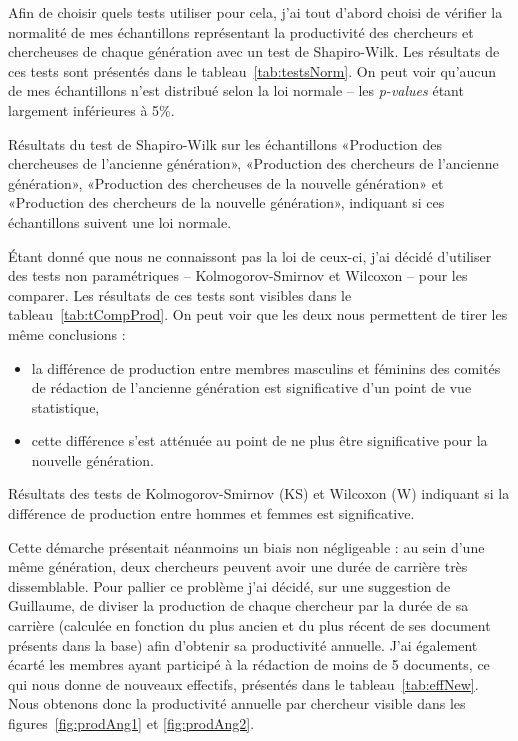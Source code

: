 			Afin de choisir quels tests utiliser pour cela, j'ai tout d'abord choisi de vérifier la normalité de mes échantillons représentant la productivité des chercheurs et chercheuses de chaque génération avec un test de Shapiro-Wilk. Les résultats de ces tests sont présentés dans le tableau~\ref{tab:testsNorm}. On peut voir qu'aucun de mes échantillons n'est distribué selon la loi normale -- les \textit{p-values} étant largement inférieures à 5\%.
			
			\begin{table}[ht]
				\centering
				\caption{Résultats du test de Shapiro-Wilk sur les échantillons «Production des chercheuses de l'ancienne génération», «Production des chercheurs de l'ancienne génération», «Production des chercheuses de la nouvelle génération» et «Production des chercheurs de la nouvelle génération», indiquant si ces échantillons suivent une loi normale.}\label{tab:testsNorm}
				
			\end{table}
			
			Étant donné que nous ne connaissont pas la loi de ceux-ci, j'ai décidé d'utiliser des tests non paramétriques -- Kolmogorov-Smirnov et Wilcoxon -- pour les comparer. Les résultats de ces tests sont visibles dans le tableau~\ref{tab:tCompProd}. On peut voir que les deux nous permettent de tirer les même conclusions :
			\begin{itemize}
				\item la différence de production entre membres masculins et féminins des comités de rédaction de l'ancienne génération est significative d'un point de vue statistique,
				\item cette différence s'est atténuée au point de ne plus être significative pour la nouvelle génération.
			\end{itemize}
			
			\begin{table}[p]
				\centering
				\caption{Résultats des tests de Kolmogorov-Smirnov (KS) et Wilcoxon (W) indiquant si la différence de production entre hommes et femmes est significative.}\label{tab:tCompProd}
				
			\end{table}
			
			
			Cette démarche présentait néanmoins un biais non négligeable : au sein d’une même génération, deux chercheurs peuvent avoir une durée de carrière très dissemblable. Pour pallier ce problème j’ai décidé, sur une suggestion de Guillaume, de diviser la production
de chaque chercheur par la durée de sa carrière (calculée en fonction du plus ancien et du plus récent de ses document présents dans la base) afin d'obtenir sa productivité annuelle. J’ai également écarté les membres ayant participé à la rédaction de moins de 5 documents, ce qui nous donne de nouveaux effectifs, présentés dans le tableau~\ref{tab:effNew}. Nous obtenons donc la productivité annuelle par chercheur visible dans les figures~\ref{fig:prodAng1} et \ref{fig:prodAng2}.
		
